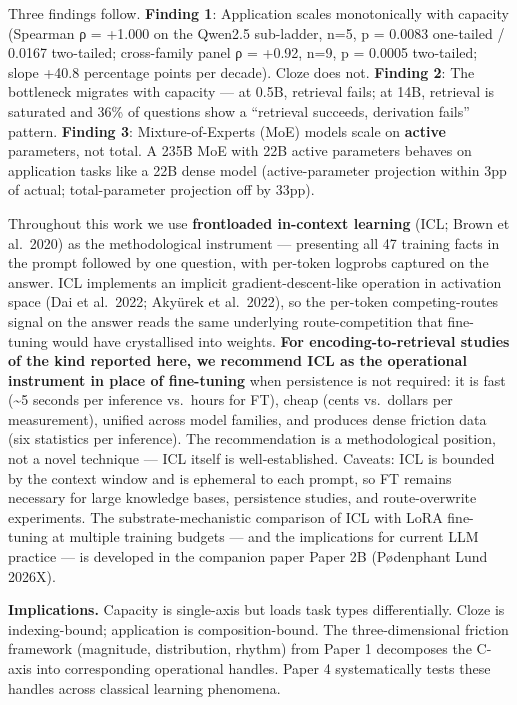 \documentclass[
]{article}
\begin{document}
Three findings follow. \textbf{Finding 1}: Application scales
monotonically with capacity (Spearman ρ = +1.000 on the Qwen2.5
sub-ladder, n=5, p = 0.0083 one-tailed / 0.0167 two-tailed; cross-family
panel ρ = +0.92, n=9, p = 0.0005 two-tailed; slope +40.8 percentage
points per decade). Cloze does not. \textbf{Finding 2}: The bottleneck
migrates with capacity --- at 0.5B, retrieval fails; at 14B, retrieval
is saturated and 36\% of questions show a ``retrieval succeeds,
derivation fails'' pattern. \textbf{Finding 3}: Mixture-of-Experts (MoE)
models scale on \textbf{active} parameters, not total. A 235B MoE with
22B active parameters behaves on application tasks like a 22B dense
model (active-parameter projection within 3pp of actual; total-parameter
projection off by 33pp).

Throughout this work we use \textbf{frontloaded in-context learning}
(ICL; Brown et al.~2020) as the methodological instrument --- presenting
all 47 training facts in the prompt followed by one question, with
per-token logprobs captured on the answer. ICL implements an implicit
gradient-descent-like operation in activation space (Dai et al.~2022;
Akyürek et al.~2022), so the per-token competing-routes signal on the
answer reads the same underlying route-competition that fine-tuning
would have crystallised into weights. \textbf{For encoding-to-retrieval
studies of the kind reported here, we recommend ICL as the operational
instrument in place of fine-tuning} when persistence is not required: it
is fast (\textasciitilde5 seconds per inference vs.~hours for FT), cheap
(cents vs.~dollars per measurement), unified across model families, and
produces dense friction data (six statistics per inference). The
recommendation is a methodological position, not a novel technique ---
ICL itself is well-established. Caveats: ICL is bounded by the context
window and is ephemeral to each prompt, so FT remains necessary for
large knowledge bases, persistence studies, and route-overwrite
experiments. The substrate-mechanistic comparison of ICL with LoRA
fine-tuning at multiple training budgets --- and the implications for
current LLM practice --- is developed in the companion paper Paper 2B
(Pødenphant Lund 2026X).

\textbf{Implications.} Capacity is single-axis but loads task types
differentially. Cloze is indexing-bound; application is
composition-bound. The three-dimensional friction framework (magnitude,
distribution, rhythm) from Paper 1 decomposes the C-axis into
corresponding operational handles. Paper 4 systematically tests these
handles across classical learning phenomena.
\end{document}
